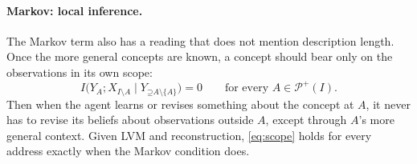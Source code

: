 \documentclass[11pt]{article}
\newcommand{\PI}{\mathcal{P}^{+}(I)}
\newcommand{\Up}{\mathord{\supseteq}}
\begin{document}
\paragraph{Markov: local inference.}
The Markov term also has a reading that does not mention description length.
Once the more general concepts are known, a concept should bear only on the
observations in its own scope:
\begin{equation}
 I\bigl(Y_A;X_{I\setminus A}\mid Y_{\Up A\setminus\{A\}}\bigr)=0
 \qquad\text{for every }A\in\PI.
 \label{eq:scope}
\end{equation}
Then when the agent learns or revises something about the concept at $A$, it
never has to revise its beliefs about observations outside $A$, except
through $A$'s more general context. Given LVM and reconstruction,
\eqref{eq:scope} holds for every address exactly when the Markov
condition does.
\end{document}
